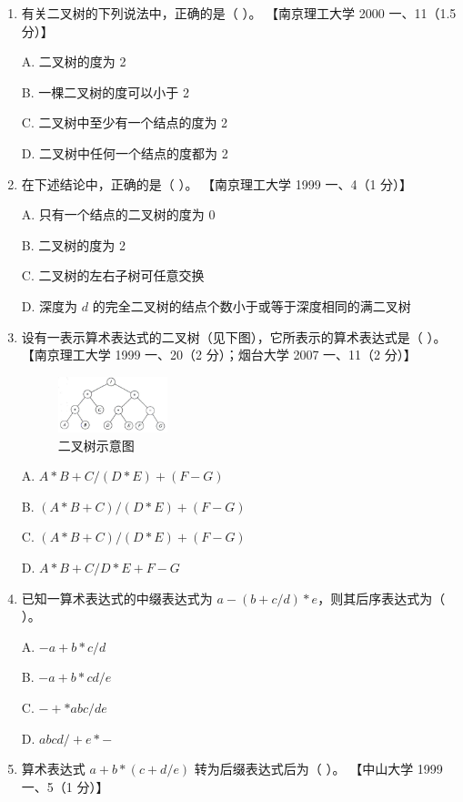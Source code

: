 \documentclass[lang=cn,newtx,10pt,scheme=chinese]{../../elegantbook}
\begin{document}
\begin{enumerate}
    \item 有关二叉树的下列说法中，正确的是（ ）。  
    【南京理工大学 2000 一、11（1.5 分）】  

    A. 二叉树的度为 2  

    B. 一棵二叉树的度可以小于 2  

    C. 二叉树中至少有一个结点的度为 2  

    D. 二叉树中任何一个结点的度都为 2  

    \item 在下述结论中，正确的是（ ）。  
    【南京理工大学 1999 一、4（1 分）】 

    A. 只有一个结点的二叉树的度为 0  

    B. 二叉树的度为 2  

    C. 二叉树的左右子树可任意交换  

    D. 深度为 $d$ 的完全二叉树的结点个数小于或等于深度相同的满二叉树  

    \item 设有一表示算术表达式的二叉树（见下图），它所表示的算术表达式是（ ）。  
    【南京理工大学 1999 一、20（2 分）；烟台大学 2007 一、11（2 分）】  

    \begin{figure}[h!]
        \centering
        \includegraphics[width=0.3\textwidth]{../../figure/exercisePicPDF/chapter6/6-30.pdf}
        \caption{二叉树示意图}
    \end{figure}

    A. $A \ast B + C / (D \ast E) + (F - G)$  

    B. $(A \ast B + C) / (D \ast E) + (F - G)$  

    C. $(A \ast B + C) / (D \ast E) + (F - G)$  

    D. $A \ast B + C / D \ast E + F - G$  

    \item 已知一算术表达式的中缀表达式为 $a - (b + c/d) \ast e$，则其后序表达式为（ ）。
    
    A. $-a + b \ast c / d$  

    B. $-a + b \ast cd/e$  


    C. $-+*abc/de$  

    D. $abcd /+e*-$  

    \item 算术表达式 $a + b \ast (c + d / e)$ 转为后缀表达式后为（ ）。  
    【中山大学 1999 一、5（1 分）】  


\end{enumerate}
\end{document}
